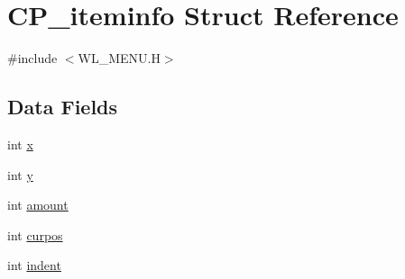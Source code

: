 \hypertarget{structCP__iteminfo}{
\section{CP\_\-iteminfo Struct Reference}
\label{structCP__iteminfo}
}


{\ttfamily \#include $<$WL\_\-MENU.H$>$}

\subsection*{Data Fields}
\begin{DoxyCompactItemize}
\item 
int \hyperlink{structCP__iteminfo_ad5d75e5c5716e962633166ab853669a9}{x}
\item 
int \hyperlink{structCP__iteminfo_aac807c1a16c82ec357334d091f4a01af}{y}
\item 
int \hyperlink{structCP__iteminfo_a425e3f50bfc822512e1d5663437ac7fe}{amount}
\item 
int \hyperlink{structCP__iteminfo_a97212c1213e5ee22c715d2456ac0576b}{curpos}
\item 
int \hyperlink{structCP__iteminfo_aff46e6a77ece90960658a6f4f1aa0a85}{indent}
\end{DoxyCompactItemize}


